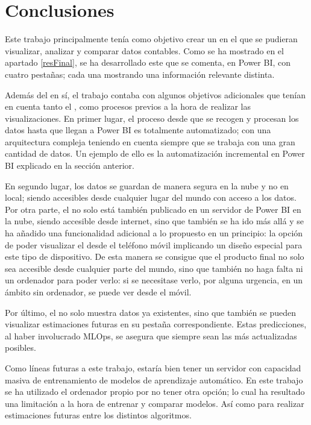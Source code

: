 \section{Conclusiones} 
 
Este trabajo principalmente tenía como objetivo crear un  en el que se pudieran visualizar, analizar y comparar datos contables. Como se ha mostrado en el apartado \ref{resFinal}, se ha desarrollado este  que se comenta, en Power BI, con cuatro pestañas; cada una mostrando una información relevante distinta.

Además del  en sí, el trabajo contaba con algunos objetivos adicionales que tenían en cuenta tanto el , como procesos previos a la hora de realizar las visualizaciones. En  primer lugar, el proceso desde que se recogen y procesan los datos hasta que llegan a Power BI es totalmente automatizado; con una arquitectura compleja teniendo en cuenta siempre que se trabaja con una gran cantidad de datos. Un ejemplo de ello es la automatización incremental en Power BI explicado en la sección anterior.

 
En segundo lugar, los datos se guardan de manera segura en la nube y no en local; siendo accesibles desde cualquier lugar del mundo con acceso a los datos. Por otra parte, el  no solo está también publicado en un servidor de Power BI en la nube, siendo accesible desde internet, sino que también se ha ido más allá y se ha añadido una funcionalidad adicional a lo propuesto en un principio: la opción de poder visualizar el  desde el teléfono móvil implicando un diseño especial para este tipo de dispositivo. De esta manera se consigue que el producto final no solo sea accesible desde cualquier parte del mundo, sino que también no haga falta ni un ordenador para poder verlo: si se necesitase verlo, por alguna urgencia, en un ámbito sin ordenador, se puede ver desde el móvil. 

Por último, el  no solo muestra datos ya existentes, sino que también se pueden visualizar estimaciones futuras en su pestaña correspondiente. Estas predicciones, al haber involucrado MLOps, se asegura que siempre sean las más actualizadas posibles.

Como líneas futuras a este trabajo, estaría bien tener un servidor con capacidad masiva de entrenamiento de modelos de aprendizaje automático. En este trabajo se ha utilizado el ordenador propio por no tener otra opción; lo cual ha resultado una limitación a la hora de entrenar y comparar modelos. Así como para realizar estimaciones futuras entre los distintos algoritmos.

